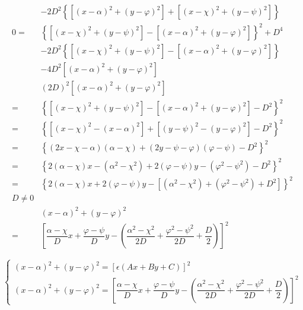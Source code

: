 \documentclass[
]{book}
\theoremstyle{definition}
\theoremstyle{definition}
\theoremstyle{definition}
\theoremstyle{definition}
\theoremstyle{remark}
\begin{document}
\[\begin{aligned}
 & -2D^{2}\left\{ \left[\left(x-\alpha\right)^{2}+\left(y-\varphi\right)^{2}\right]+\left[\left(x-\chi\right)^{2}+\left(y-\psi\right)^{2}\right]\right\} \\
0= & \left\{ \left[\left(x-\chi\right)^{2}+\left(y-\psi\right)^{2}\right]-\left[\left(x-\alpha\right)^{2}+\left(y-\varphi\right)^{2}\right]\right\} ^{2}+D^{4}\\
 & -2D^{2}\left\{ \left[\left(x-\chi\right)^{2}+\left(y-\psi\right)^{2}\right]-\left[\left(x-\alpha\right)^{2}+\left(y-\varphi\right)^{2}\right]\right\} \\
 & -4D^{2}\left[\left(x-\alpha\right)^{2}+\left(y-\varphi\right)^{2}\right]\\
 & \left(2D\right)^{2}\left[\left(x-\alpha\right)^{2}+\left(y-\varphi\right)^{2}\right]\\
= & \left\{ \left[\left(x-\chi\right)^{2}+\left(y-\psi\right)^{2}\right]-\left[\left(x-\alpha\right)^{2}+\left(y-\varphi\right)^{2}\right]-D^{2}\right\} ^{2}\\
= & \left\{ \left[\left(x-\chi\right)^{2}-\left(x-\alpha\right)^{2}\right]+\left[\left(y-\psi\right)^{2}-\left(y-\varphi\right)^{2}\right]-D^{2}\right\} ^{2}\\
= & \left\{ \left(2x-\chi-\alpha\right)\left(\alpha-\chi\right)+\left(2y-\psi-\varphi\right)\left(\varphi-\psi\right)-D^{2}\right\} ^{2}\\
= & \left\{ 2\left(\alpha-\chi\right)x-\left(\alpha^{2}-\chi^{2}\right)+2\left(\varphi-\psi\right)y-\left(\varphi^{2}-\psi^{2}\right)-D^{2}\right\} ^{2}\\
= & \left\{ 2\left(\alpha-\chi\right)x+2\left(\varphi-\psi\right)y-\left[\left(\alpha^{2}-\chi^{2}\right)+\left(\varphi^{2}-\psi^{2}\right)+D^{2}\right]\right\} ^{2}\\
D\ne0\\
 & \left(x-\alpha\right)^{2}+\left(y-\varphi\right)^{2}\\
= & \left[\dfrac{\alpha-\chi}{D}x+\dfrac{\varphi-\psi}{D}y-\left(\dfrac{\alpha^{2}-\chi^{2}}{2D}+\dfrac{\varphi^{2}-\psi^{2}}{2D}+\dfrac{D}{2}\right)\right]^{2}
\end{aligned}
\]

\[
\begin{cases}
\left(x-\alpha\right)^{2}+\left(y-\varphi\right)^{2}=\left[\epsilon\left(Ax+By+C\right)\right]^{2}\\
\left(x-\alpha\right)^{2}+\left(y-\varphi\right)^{2}=\left[\dfrac{\alpha-\chi}{D}x+\dfrac{\varphi-\psi}{D}y-\left(\dfrac{\alpha^{2}-\chi^{2}}{2D}+\dfrac{\varphi^{2}-\psi^{2}}{2D}+\dfrac{D}{2}\right)\right]^{2}
\end{cases}
\]
\end{document}
